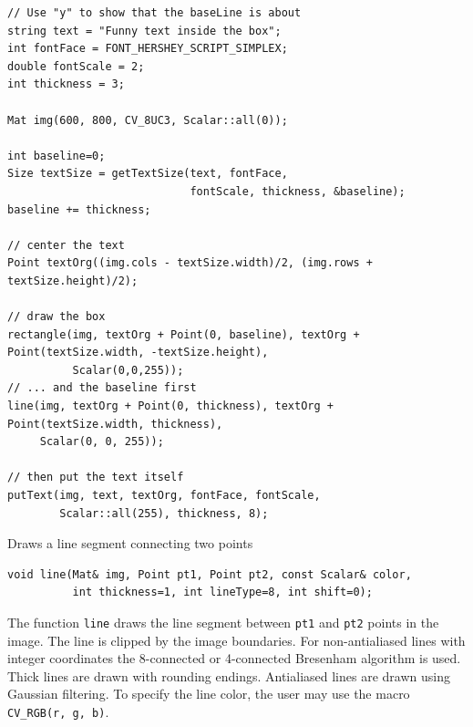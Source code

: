 \begin{lstlisting}
// Use "y" to show that the baseLine is about
string text = "Funny text inside the box";
int fontFace = FONT_HERSHEY_SCRIPT_SIMPLEX;
double fontScale = 2;
int thickness = 3;

Mat img(600, 800, CV_8UC3, Scalar::all(0));

int baseline=0;
Size textSize = getTextSize(text, fontFace,
                            fontScale, thickness, &baseline);
baseline += thickness;

// center the text
Point textOrg((img.cols - textSize.width)/2, (img.rows + textSize.height)/2);

// draw the box
rectangle(img, textOrg + Point(0, baseline), textOrg + Point(textSize.width, -textSize.height),
          Scalar(0,0,255));
// ... and the baseline first
line(img, textOrg + Point(0, thickness), textOrg + Point(textSize.width, thickness),
     Scalar(0, 0, 255));

// then put the text itself
putText(img, text, textOrg, fontFace, fontScale,
        Scalar::all(255), thickness, 8);
\end{lstlisting}
        
        
\label{line}
Draws a line segment connecting two points

\begin{lstlisting}
void line(Mat& img, Point pt1, Point pt2, const Scalar& color,
          int thickness=1, int lineType=8, int shift=0);
\end{lstlisting}
\begin{description}
\end{description}

The function \texttt{line} draws the line segment between
\texttt{pt1} and \texttt{pt2} points in the image. The line is
clipped by the image boundaries. For non-antialiased lines
with integer coordinates the 8-connected or 4-connected Bresenham
algorithm is used. Thick lines are drawn with rounding endings.
Antialiased lines are drawn using Gaussian filtering. To specify
the line color, the user may use the macro
\texttt{CV\_RGB(r, g, b)}.


